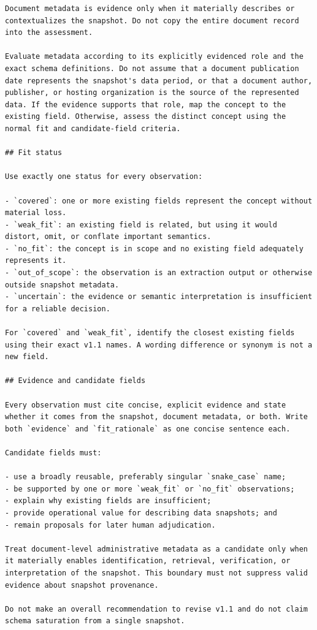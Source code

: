 \documentclass{article}
\begin{document}
\begin{lstlisting}
Document metadata is evidence only when it materially describes or contextualizes the snapshot. Do not copy the entire document record into the assessment.

Evaluate metadata according to its explicitly evidenced role and the exact schema definitions. Do not assume that a document publication date represents the snapshot's data period, or that a document author, publisher, or hosting organization is the source of the represented data. If the evidence supports that role, map the concept to the existing field. Otherwise, assess the distinct concept using the normal fit and candidate-field criteria.

## Fit status

Use exactly one status for every observation:

- `covered`: one or more existing fields represent the concept without material loss.
- `weak_fit`: an existing field is related, but using it would distort, omit, or conflate important semantics.
- `no_fit`: the concept is in scope and no existing field adequately represents it.
- `out_of_scope`: the observation is an extraction output or otherwise outside snapshot metadata.
- `uncertain`: the evidence or semantic interpretation is insufficient for a reliable decision.

For `covered` and `weak_fit`, identify the closest existing fields using their exact v1.1 names. A wording difference or synonym is not a new field.

## Evidence and candidate fields

Every observation must cite concise, explicit evidence and state whether it comes from the snapshot, document metadata, or both. Write both `evidence` and `fit_rationale` as one concise sentence each.

Candidate fields must:

- use a broadly reusable, preferably singular `snake_case` name;
- be supported by one or more `weak_fit` or `no_fit` observations;
- explain why existing fields are insufficient;
- provide operational value for describing data snapshots; and
- remain proposals for later human adjudication.

Treat document-level administrative metadata as a candidate only when it materially enables identification, retrieval, verification, or interpretation of the snapshot. This boundary must not suppress valid evidence about snapshot provenance.

Do not make an overall recommendation to revise v1.1 and do not claim schema saturation from a single snapshot.
\end{lstlisting}
\end{document}
